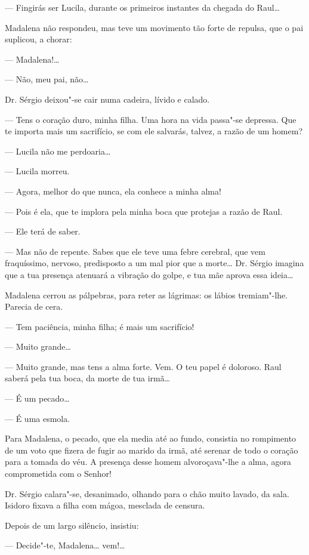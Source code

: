 --- Fingirás ser Lucila, durante os primeiros instantes
da chegada do Raul\ldots{}

Madalena não respondeu, mas teve um movimento tão forte de repulsa, que
o pai suplicou, a chorar:

--- Madalena!\ldots{}

--- Não, meu pai, não\ldots{}

Dr. Sérgio deixou"-se cair numa cadeira, lívido e calado.

--- Tens o coração duro, minha filha. Uma hora na vida passa"-se
depressa. Que te importa mais um sacrifício, se com ele salvarás,
talvez, a razão de um homem?

--- Lucila não me perdoaria\ldots{}

--- Lucila morreu.

--- Agora, melhor do que nunca, ela conhece a minha alma!

--- Pois é ela, que te implora pela minha boca que protejas a razão de
Raul.

--- Ele terá de saber.

--- Mas não de repente. Sabes que ele teve uma febre cerebral, que vem
fraquíssimo, nervoso, predisposto a um mal pior que a morte\ldots{} Dr.
Sérgio imagina que a tua presença atenuará a vibração do golpe, e tua
mãe aprova essa ideia\ldots{}

Madalena cerrou as pálpebras, para reter as lágrimas: os lábios
tremiam"-lhe. Parecia de cera.

--- Tem paciência, minha filha; é mais um sacrifício!

--- Muito grande\ldots{}

--- Muito grande, mas tens a alma forte. Vem. O teu papel é doloroso.
Raul saberá pela tua boca, da morte de tua irmã\ldots{}

--- É um pecado\ldots{}

--- É uma esmola.

Para Madalena, o pecado, que ela media até ao fundo, consistia no
rompimento de um voto que fizera de fugir ao marido da irmã, até serenar
de todo o coração para a tomada do véu. A presença desse homem
alvoroçava"-lhe a alma, agora comprometida com o Senhor!

Dr. Sérgio calara"-se, desanimado, olhando para o chão muito lavado, da
sala. Isidoro fixava a filha com mágoa, mesclada de censura.

Depois de um largo silêncio, insistiu:

--- Decide"-te, Madalena\ldots{} vem!\ldots{}

